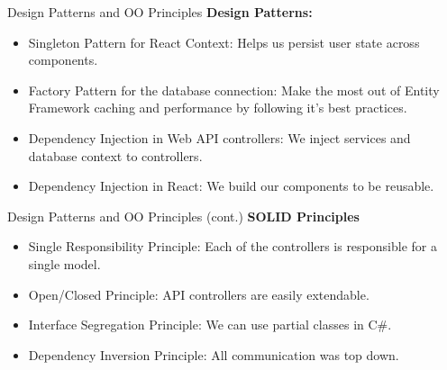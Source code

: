\documentclass{beamer}
\begin{document}
\begin{frame}{Design Patterns and OO Principles}
    \textbf{Design Patterns:}
    \begin{itemize}
        \item Singleton Pattern for React Context: Helps us persist user state across components.
        \item Factory Pattern for the database connection: Make the most out of Entity Framework caching and 
        performance by following it's best practices. 
        \item Dependency Injection in Web API controllers: We inject services and database context to controllers.
        \item Dependency Injection in React: We build our components to be reusable.
    \end{itemize}
\end{frame}

\begin{frame}{Design Patterns and OO Principles (cont.)}
\textbf{SOLID Principles}
    \begin{itemize}
        \item Single Responsibility Principle: Each of the controllers is responsible for a single model.
        \item Open/Closed Principle: API controllers are easily extendable.
        \item Interface Segregation Principle: We can use partial classes in C\#.
        \item Dependency Inversion Principle: All communication was top down.
    \end{itemize}
\end{frame}
\end{document}
